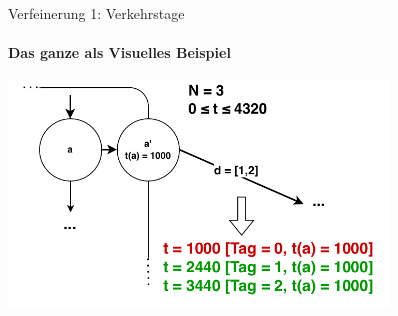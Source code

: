 \begin{frame}{Verfeinerung 1: Verkehrstage}
\framesubtitle{Das ganze als Visuelles Beispiel}
	\begin{center}
		\includegraphics[height=6cm]{images/time-expanded/verkehrstage-beispiel.pdf} 
	\end{center}
\end{frame}


%


